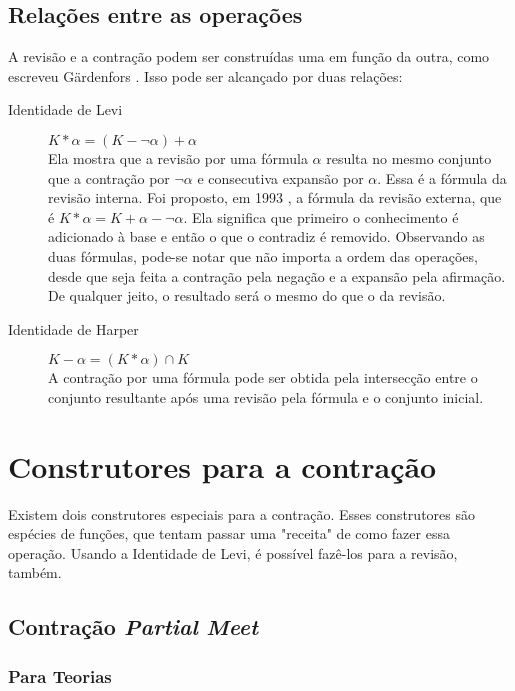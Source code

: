\subsection{Relações entre as operações}

A revisão e a contração podem ser construídas uma em função da outra, como escreveu Gärdenfors \cite{revisaoGardenfors}. Isso pode ser alcançado por duas relações:

\begin{description}
	\item[Identidade de Levi] $ K \ast \alpha = (K - \lnot \alpha) + \alpha $ \\ Ela mostra que a revisão por uma fórmula $ \alpha $ resulta no mesmo conjunto que a contração por $ \lnot \alpha $ e consecutiva expansão por $ \alpha $. Essa é a fórmula da revisão interna. Foi proposto, em 1993 \cite{revisaoHansson2}, a fórmula da revisão externa, que é $ K \ast \alpha = K + \alpha - \lnot \alpha $. Ela significa que primeiro o conhecimento é adicionado à base e então o que o contradiz é removido. Observando as duas fórmulas, pode-se notar que não importa a ordem das operações, desde que seja feita a contração pela negação e a expansão pela afirmação. De qualquer jeito, o resultado será o mesmo do que o da revisão.
	\item[Identidade de Harper] $ K - \alpha = (K \ast \alpha) \cap K $ \\ A contração por uma fórmula pode ser obtida pela intersecção entre o conjunto resultante após uma revisão pela fórmula e o conjunto inicial.
\end{description}

\section{Construtores para a contração}

Existem dois construtores especiais para a contração. Esses construtores são espécies de funções, que tentam passar uma "receita" de como fazer essa operação. Usando a Identidade de Levi, é possível fazê-los para a revisão, também.

\subsection{Contração \textit{Partial Meet}}

\subsubsection{Para Teorias}

